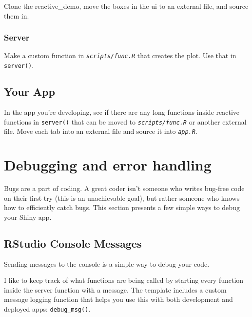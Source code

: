 \documentclass[
  oneside]{book}
\begin{document}
Clone the reactive\_demo, move the boxes in the ui to an external file, and source them in.

\hypertarget{server}{%
\subsection{Server}\label{server}}

Make a custom function in \textit{\texttt{scripts/func.R}} that creates the plot. Use that in \texttt{server}\texttt{()}.

\hypertarget{your-app-structure}{%
\section{Your App}\label{your-app-structure}}

In the app you're developing, see if there are any long functions inside reactive functions in \texttt{server}\texttt{()} that can be moved to \textit{\texttt{scripts/func.R}} or another external file. Move each tab into an external file and source it into \textit{\texttt{app.R}}.

\hypertarget{debugging}{%
\chapter{Debugging and error handling}\label{debugging}}

Bugs are a part of coding. A great coder isn't someone who writes bug-free code on their first try (this is an unachievable goal), but rather someone who knows how to efficiently catch bugs. This section presents a few simple ways to debug your Shiny app.

\hypertarget{rstudio-console-messages}{%
\section{RStudio Console Messages}\label{rstudio-console-messages}}

Sending messages to the console is a simple way to debug your code.

I like to keep track of what functions are being called by starting every function inside the server function with a message. The template includes a custom message logging function that helps you use this with both development and deployed apps: \texttt{debug\_msg}\texttt{()}.
\end{document}
